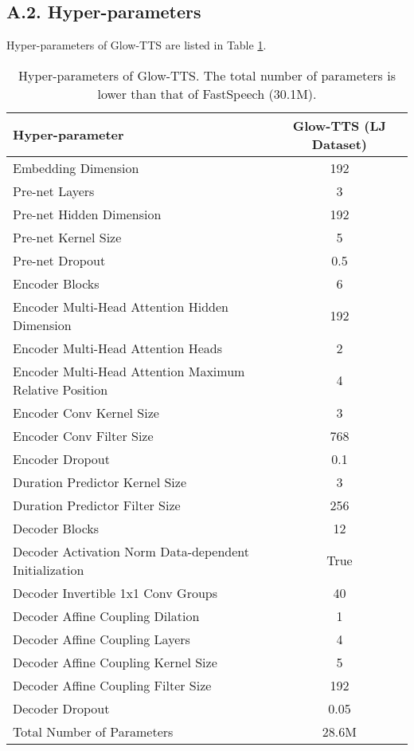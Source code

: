 \documentclass{article}
\begin{document}
\newpage
\subsection*{A.2. Hyper-parameters}
\label{appa2}
Hyper-parameters of Glow-TTS are listed in Table \ref{tab_hyper}.
\newline
\begin{table}[h]
    \centering
    \begin{tabular}{l|c}
        \toprule
        \textbf{Hyper-parameter} & \textbf{Glow-TTS (LJ Dataset)}\\
        \hline
        Embedding Dimension & 192 \\
        \hline
        Pre-net Layers & 3 \\
        \hline
        Pre-net Hidden Dimension & 192 \\
        \hline
        Pre-net Kernel Size & 5 \\
        \hline
        Pre-net Dropout & 0.5 \\
        \hline
        Encoder Blocks & 6 \\
        \hline
        Encoder Multi-Head Attention Hidden Dimension & 192 \\
        \hline
        Encoder Multi-Head Attention Heads & 2 \\
        \hline
        Encoder Multi-Head Attention Maximum Relative Position & 4 \\
        \hline
        Encoder Conv Kernel Size & 3 \\
        \hline
        Encoder Conv Filter Size & 768 \\
        \hline
        Encoder Dropout & 0.1 \\
        \hline
        Duration Predictor Kernel Size & 3 \\
        \hline
        Duration Predictor Filter Size & 256 \\
        \hline
        Decoder Blocks & 12 \\
        \hline
        Decoder Activation Norm Data-dependent Initialization & True \\
        \hline
        Decoder Invertible 1x1 Conv Groups & 40 \\
        \hline
        Decoder Affine Coupling Dilation & 1 \\
        \hline
        Decoder Affine Coupling Layers & 4 \\
        \hline
        Decoder Affine Coupling Kernel Size & 5 \\
        \hline
        Decoder Affine Coupling Filter Size & 192 \\
        \hline
        Decoder Dropout & 0.05 \\
        \hhline{=|=}
        Total Number of Parameters & 28.6M \\
        \bottomrule
    \end{tabular}
    \caption{Hyper-parameters of Glow-TTS. The total number of parameters is lower than that of FastSpeech (30.1M).}
    \label{tab_hyper}
\end{table}
\end{document}
